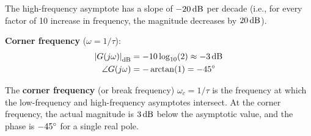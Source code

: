 The high-frequency asymptote has a slope of $-20\,\text{dB}$ per decade (i.e., for every factor of 10 increase in frequency, the magnitude decreases by $20\,\text{dB}$).

\textbf{Corner frequency} ($\omega = 1/\tau$):
\begin{align}
\left|G(j\omega)\right|_{\text{dB}} &= -10\log_{10}(2) \approx -3\,\text{dB} \\
\angle G(j\omega) &= -\arctan(1) = -45^\circ
\end{align}

\begin{definition}
The \textbf{corner frequency} (or break frequency) $\omega_c = 1/\tau$ is the frequency at which the low-frequency and high-frequency asymptotes intersect. At the corner frequency, the actual magnitude is $3\,\text{dB}$ below the asymptotic value, and the phase is $-45^\circ$ for a single real pole.
\end{definition}

